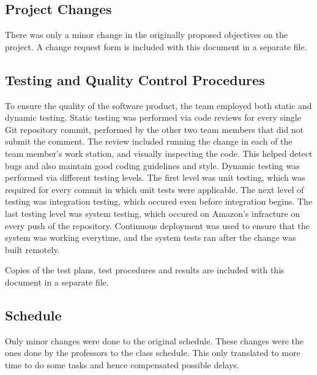 \subsection{Project Changes}
There was only a minor change in the originally proposed objectives on the project. A change request form is included with this document in a separate file.
   
\subsection{Testing and Quality Control Procedures}

To ensure the quality of the software product, the team employed both static
and dynamic testing. Static testing was performed via code reviews for every
single Git repository commit, performed by the other two team members
that did not submit the comment. The review included running the change in each of the team
member's work station, and visually inspecting the code. This helped detect
bugs and also maintain good coding guidelines and style. Dynamic testing was
performed via different testing levels. The first level was unit testing,
which was required for every commit in which unit tests were applicable. The next level of testing was integration testing, which occured even before integration begins. The last testing level was system
testing, which occured on Amazon's infracture on every push of the
repository. Continuous deployment was used to ensure
that the system was working everytime, and the system tests ran after the
change was built remotely.

Copies of the test plans, test procedures and results are included with this document in a separate file.

\subsection{Schedule}

Only minor changes were done to the original schedule. These changes were the ones done by the professors to the class schedule. This only translated to more time to do some tasks and hence compensated possible delays.
